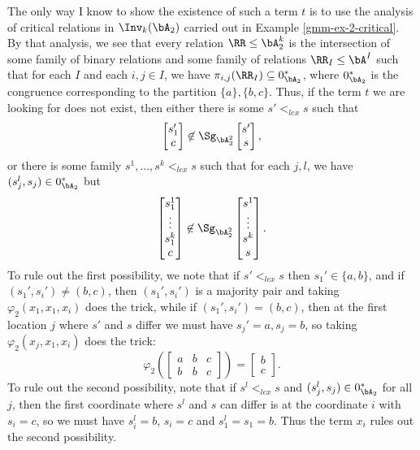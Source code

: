 \begin{ex}
The only way I know to show the existence of such a term $t$ is to use the analysis of critical relations in $\Inv_k(\bA_2)$ carried out in Example \ref{gmm-ex-2-critical}. By that analysis, we see that every relation $\RR \le \bA_2^k$ is the intersection of some family of binary relations and some family of relations $\RR_I \le \bA^I$ such that for each $I$ and each $i,j \in I$, we have $\pi_{i,j}(\RR_I) \subseteq 0_{\bA_2}^*$, where $0_{\bA_2}^*$ is the congruence corresponding to the partition $\{a\}, \{b,c\}$. Thus, if the term $t$ we are looking for does not exist, then either there is some $s' <_{lex} s$ such that
\[
\begin{bmatrix} s_1'\\ c\end{bmatrix} \not\in \Sg_{\bA_2^2}\begin{bmatrix}s' \\ s\end{bmatrix},
\]
or there is some family $s^1, ..., s^k <_{lex} s$ such that for each $j,l$, we have $(s_j^l, s_j) \in 0_{\bA_2}^*$ but
\[
\begin{bmatrix} s_1^1\\ \vdots \\ s_1^k\\ c\end{bmatrix} \not\in \Sg_{\bA_2^2}\begin{bmatrix} s^1 \\ \vdots \\ s^k\\ s\end{bmatrix}.
\]
To rule out the first possibility, we note that if $s' <_{lex} s$ then $s_1' \in \{a,b\}$, and if $(s_1',s_i') \ne (b,c)$, then $(s_1',s_i')$ is a majority pair and taking $\varphi_2(x_1,x_1,x_i)$ does the trick, while if $(s_1',s_i') = (b,c)$, then at the first location $j$ where $s'$ and $s$ differ we must have $s_j' = a, s_j = b$, so taking $\varphi_2(x_j, x_1, x_i)$ does the trick:
\[
\varphi_2\left(\begin{bmatrix} a & b & c\\ b & b & c\end{bmatrix}\right) = \begin{bmatrix} b\\ c\end{bmatrix}.
\]
To rule out the second possibility, note that if $s^l <_{lex} s$ and $(s_j^l, s_j) \in 0_{\bA_2}^*$ for all $j$, then the first coordinate where $s^l$ and $s$ can differ is at the coordinate $i$ with $s_i = c$, so we must have $s_i^l = b$, $s_i = c$ and $s_1^l = s_1 = b$. Thus the term $x_i$ rules out the second possibility.
\end{ex}


